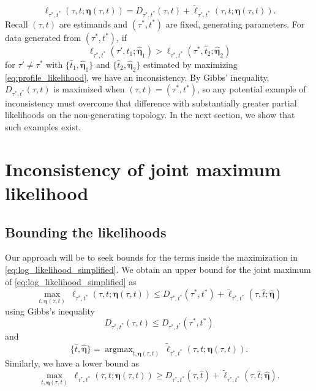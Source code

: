 \documentclass[a4paper]{article}
\newcommand{\fullAncestralSplitPartitions}{\boldsymbol\eta}
\newcommand{\shannonDivergence}{D}
\DeclareMathOperator*{\argmax}{argmax}
\begin{document}
\begin{equation}
    \label{eq:log_likelihood_simplified}
    \ell_{\tau^*,t^*}(\tau, t; \fullAncestralSplitPartitions(\tau,t)) = \shannonDivergence_{\tau^*,t^*}(\tau,t) + \tilde{\ell}_{\tau^*,t^*}(\tau, t; \fullAncestralSplitPartitions(\tau,t)).
\end{equation}
Recall $(\tau, t)$ are estimands and $(\tau^*, t^*)$ are fixed, generating parameters.
For data generated from $(\tau^*, t^*)$, if
\begin{equation}
\label{eq:inconsistency_inequality}
\ell_{\tau^*,t^*}(\tau', \hat{t}_1; \hat{\fullAncestralSplitPartitions}_1) > \ell_{\tau^*,t^*}(\tau^*, \hat{t}_2; \hat{\fullAncestralSplitPartitions}_2)
\end{equation}
for $\tau'\neq\tau^*$ with $\{\hat{t}_1,\hat{\fullAncestralSplitPartitions}_1\}$ and $\{\hat{t}_2,\hat{\fullAncestralSplitPartitions}_2\}$ estimated by maximizing \eqref{eq:profile_likelihood}, we have an inconsistency.
By Gibbs' inequality, $\shannonDivergence_{\tau^*,t^*}(\tau,t)$ is maximized when $(\tau,t) = (\tau^*,t^*)$, so any potential example of inconsistency must overcome that difference with substantially greater partial likelihoods on the non-generating topology.
In the next section, we show that such examples exist.

\section{Inconsistency of joint maximum likelihood}

\subsection{Bounding the likelihoods}

Our approach will be to seek bounds for the terms inside the maximization in \eqref{eq:log_likelihood_simplified}.
We obtain an upper bound for the joint maximum of \eqref{eq:log_likelihood_simplified} as
$$
\max_{t,\fullAncestralSplitPartitions(\tau,t)} \ \ell_{\tau^*,t^*}(\tau, t; \fullAncestralSplitPartitions(\tau,t)) \le
    \shannonDivergence_{\tau^*,t^*}(\tau^*,t^*)
    + \tilde{\ell}_{\tau^*,t^*}(\tau, \hat{t}; \hat{\fullAncestralSplitPartitions})
$$
using Gibbs's inequality
$$
\shannonDivergence_{\tau^*,t^*}(\tau,t) \le \shannonDivergence_{\tau^*,t^*}(\tau^*,t^*)
$$
and
$$
\{\hat{t},\hat{\fullAncestralSplitPartitions}\} = \argmax_{t,\fullAncestralSplitPartitions(\tau,t)} \ \tilde{\ell}_{\tau^*,t^*}(\tau, t; \fullAncestralSplitPartitions(\tau,t)).
$$
Similarly, we have a lower bound as
$$
\max_{t,\fullAncestralSplitPartitions(\tau,t)} \ \ell_{\tau^*,t^*}(\tau, t; \fullAncestralSplitPartitions(\tau,t)) \ge
    \shannonDivergence_{\tau^*,t^*}(\tau,\hat{t})
    + \tilde{\ell}_{\tau^*,t^*}(\tau, \hat{t}; \hat{\fullAncestralSplitPartitions}).
$$
\end{document}

